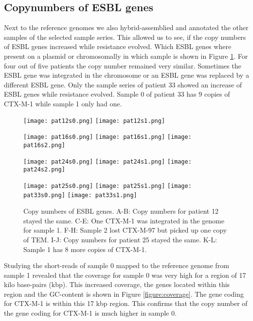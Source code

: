 \subsection{Copynumbers of ESBL genes}
Next to the reference genomes we also hybrid-assemblied and annotated the other samples of the selected sample series. This allowed us to see, if the copy numbers of ESBL genes increased while resistance evolved. Which ESBL genes where present on a plasmid or chromosomally in which sample is shown in Figure \ref{figure:esbl_genes}. For four out of five patients the copy number remained very similar. Sometimes the ESBL gene was integrated in the chromosome or an ESBL gene was replaced by a different ESBL gene. Only the sample series of patient 33 showed an increase of ESBL genes while resistance evolved. Sample 0 of patient 33 has 9 copies of CTX-M-1 while sample 1 only had one. 
\begin{figure}[H]
	\texttt{[image: pat12s0.png]}
	\texttt{[image: pat12s1.png]}	
	
	\texttt{[image: pat16s0.png]}
	\texttt{[image: pat16s1.png]}
	\texttt{[image: pat16s2.png]}
	
	\texttt{[image: pat24s0.png]}
	\texttt{[image: pat24s1.png]}
	\texttt{[image: pat24s2.png]}
	
	\texttt{[image: pat25s0.png]}\hfill	
	\texttt{[image: pat25s1.png]}\hfill
	\texttt{[image: pat33s0.png]}\hfill
	\texttt{[image: pat33s1.png]}\hfill
	
	\caption{Copy numbers of ESBL genes. A-B: Copy numbers for patient 12 stayed the same. C-E: One CTX-M-1 was integrated in the genome for sample 1. F-H: Sample 2 lost CTX-M-97 but picked up one copy of TEM. I-J: Copy numbers for patient 25 stayed the same. K-L: Sample 1 has 8 more copies of CTX-M-1.}
	\label{figure:esbl_genes}
\end{figure}
Studying the short-reads of sample 0 mapped to the reference genome from sample 1 revealed that the coverage for sample 0 was very high for a region of 17 kilo base-pairs (kbp). This increased coverage, the genes located within this region and the GC-content is shown in Figure \ref{figure:coverage}. The gene coding for CTX-M-1 is within this 17 kbp region. This confirms that the copy number of the gene coding for CTX-M-1 is much higher in sample 0.

